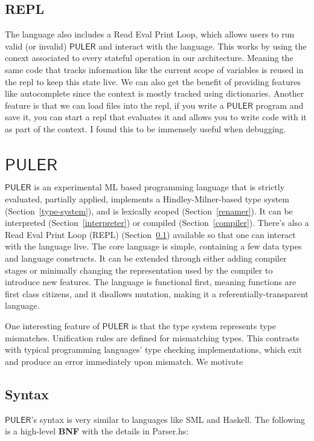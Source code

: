 \documentclass{article} %
\newcommand{\PULER}{\mathsf{PULER}}
\begin{document}
\subsection{REPL}\label{repl}
    The language also includes a Read Eval Print Loop, which allows users to run valid (or invalid) $\PULER$ and interact with the language. This works by using the conext associated to every stateful operation in our architecture. Meaning the same code that tracks information like the current scope of variables is reused in the repl to keep this state live. We can also get the benefit of providing features like autocomplete since the context is mostly tracked using dictionaries. Another feature is that we can load files into the repl, if you write a $\PULER$ program and save it, you can start a repl that evaluates it and allows you to write code with it as part of the context. I found this to be immensely useful when debugging.

\section{$\PULER$}\label{puler}
$\PULER$ is an experimental ML based programming language that is strictly evaluated, partially applied, implements a Hindley-Milner-based \cite{Hindley-Milner} type system (Section~\ref{type-system}), and is lexically scoped (Section~\ref{renamer}). It can be interpreted (Section~\ref{interpreter}) or compiled (Section~\ref{compiler}). There's also a Read Eval Print Loop (REPL) (Section~\ref{repl}) available so that one can interact with the language live. The core language is simple, containing a few data types and language constructs. It can be extended through either adding compiler stages or minimally changing the representation used by the compiler to introduce new features. The language is functional first, meaning functions are first class citizens, and it disallows mutation, making it a referentially-transparent language.
    
One interesting feature of $\PULER$ is that the type system represents type mismatches. Unification rules are defined for mismatching types. This contrasts with typical programming languages' type checking implementations, which exit and produce an error immediately upon mismatch. We motivate 

\subsection{Syntax}\label{syntax}
$\PULER$'s syntax is very similar to languages like SML and Haskell. The following is a high-level \textbf{BNF}\cite{BNF} with the details in Parser.hs:
\end{document}
